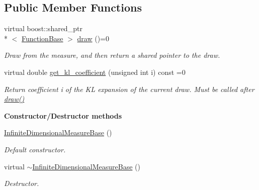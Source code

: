 \subsection*{Public Member Functions}
\begin{DoxyCompactItemize}
\item 
virtual boost\-::shared\-\_\-ptr\\*
$<$ \hyperlink{class_q_u_e_s_o_1_1_function_base}{Function\-Base} $>$ \hyperlink{class_q_u_e_s_o_1_1_infinite_dimensional_measure_base_a6357b505c9d50f9a5c30583bdf361d7e}{draw} ()=0
\begin{DoxyCompactList}\small\item\em Draw from the measure, and then return a shared pointer to the draw. \end{DoxyCompactList}\item 
virtual double \hyperlink{class_q_u_e_s_o_1_1_infinite_dimensional_measure_base_a85c57f9eb7cfec24122f8fb856066d25}{get\-\_\-kl\-\_\-coefficient} (unsigned int i) const =0
\begin{DoxyCompactList}\small\item\em Return coefficient {\ttfamily i} of the K\-L expansion of the current draw. Must be called after \hyperlink{class_q_u_e_s_o_1_1_infinite_dimensional_measure_base_a6357b505c9d50f9a5c30583bdf361d7e}{draw()} \end{DoxyCompactList}\end{DoxyCompactItemize}
\begin{Indent}{\bf Constructor/\-Destructor methods}\par
\begin{DoxyCompactItemize}
\item 
\hyperlink{class_q_u_e_s_o_1_1_infinite_dimensional_measure_base_a663782b71522112a0584b27205ac262f}{Infinite\-Dimensional\-Measure\-Base} ()
\begin{DoxyCompactList}\small\item\em Default constructor. \end{DoxyCompactList}\item 
virtual \hyperlink{class_q_u_e_s_o_1_1_infinite_dimensional_measure_base_ac979695e339a86943ddda77d72a4a9e6}{$\sim$\-Infinite\-Dimensional\-Measure\-Base} ()
\begin{DoxyCompactList}\small\item\em Destructor. \end{DoxyCompactList}\end{DoxyCompactItemize}
\end{Indent}


